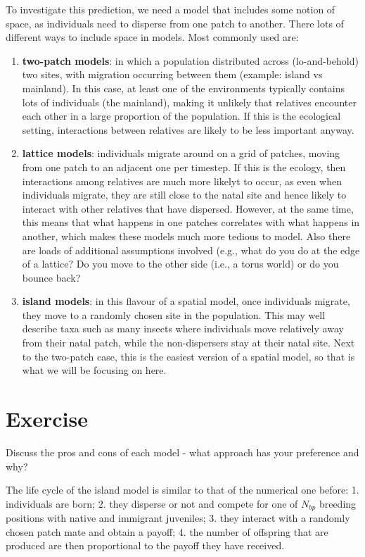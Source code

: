 \documentclass[
]{book}
\begin{document}
To investigate this prediction, we need a model that includes some notion of space, as individuals need to disperse from one patch to another. There lots of different ways to include space in models. Most commonly used are:

\begin{enumerate}
\def\labelenumi{\arabic{enumi}.}
\item
  \textbf{two-patch models}: in which a population distributed across (lo-and-behold) two sites, with migration occurring between them (example: island vs mainland). In this case, at least one of the environments typically contains lots of individuals (the mainland), making it unlikely that relatives encounter each other in a large proportion of the population. If this is the ecological setting, interactions between relatives are likely to be less important anyway.
\item
  \textbf{lattice models}: individuals migrate around on a grid of patches, moving from one patch to an adjacent one per timestep. If this is the ecology, then interactions among relatives are much more likelyt to occur, as even when individuals migrate, they are still close to the natal site and hence likely to interact with other relatives that have dispersed. However, at the same time, this means that what happens in one patches correlates with what happens in another, which makes these models much more tedious to model. Also there are loads of additional assumptions involved (e.g., what do you do at the edge of a lattice? Do you move to the other side (i.e., a torus world) or do you bounce back?
\item
  \textbf{island models}: in this flavour of a spatial model, once individuals migrate, they move to a randomly chosen site in the population. This may well describe taxa such as many insects where individuals move relatively away from their natal patch, while the non-dispersers stay at their natal site. Next to the two-patch case, this is the easiest version of a spatial model, so that is what we will be focusing on here.
\end{enumerate}

\section{Exercise}\label{exercise-7}

Discuss the pros and cons of each model - what approach has your preference and why?

The life cycle of the island model is similar to that of the numerical one before: 1. individuals are born; 2. they disperse or not and compete for one of \(N_{bp}\) breeding positions with native and immigrant juveniles; 3. they interact with a randomly chosen patch mate and obtain a payoff; 4. the number of offspring that are produced are then proportional to the payoff they have received.
\end{document}
